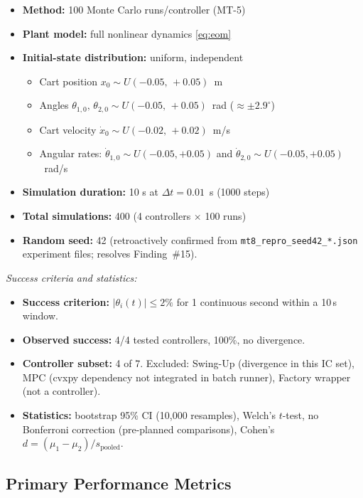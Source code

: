\documentclass[10pt, a4paper]{article}
\begin{document}
\begin{itemize}[noitemsep]
  \item \textbf{Method:} 100 Monte Carlo runs/controller (MT-5)
  \item \textbf{Plant model:} full nonlinear dynamics \eqref{eq:eom}
  \item \textbf{Initial-state distribution:} uniform, independent
    \begin{itemize}[noitemsep]
      \item Cart position $x_0 \sim U(-0.05,\, +0.05)$~m
      \item Angles $\theta_{1,0},\, \theta_{2,0} \sim U(-0.05,\, +0.05)$~rad ($\approx\pm2.9^\circ$)
      \item Cart velocity $\dot{x}_0 \sim U(-0.02,\, +0.02)$~m/s
      \item Angular rates: $\dot{\theta}_{1,0} \sim U(-0.05,+0.05)$ and
            $\dot{\theta}_{2,0} \sim U(-0.05,+0.05)$~rad/s
    \end{itemize}
  \item \textbf{Simulation duration:} 10 s at $\Delta t = 0.01$~s (1000 steps)
  \item \textbf{Total simulations:} 400 (4 controllers $\times$ 100 runs)
  \item \textbf{Random seed:} 42 (retroactively confirmed from
  \texttt{mt8\_repro\_seed42\_*.json} experiment files; resolves Finding~\#15).
\end{itemize}

\noindent\textit{Success criteria and statistics:}

\begin{itemize}[noitemsep]
  \item \textbf{Success criterion:} $|\theta_i(t)| \leq 2\%$ for 1 continuous second
        within a 10\,s window.
  \item \textbf{Observed success:} 4/4 tested controllers, 100\%, no divergence.
  \item \textbf{Controller subset:} 4 of 7.
        Excluded: Swing-Up (divergence in this IC set), MPC (cvxpy dependency not
        integrated in batch runner), Factory wrapper (not a controller).
  \item \textbf{Statistics:} bootstrap 95\% CI (10,000 resamples), Welch's $t$-test,
        no Bonferroni correction (pre-planned comparisons), Cohen's
        $d = (\mu_1 - \mu_2)/s_\text{pooled}$.
\end{itemize}

\subsection{Primary Performance Metrics}
\end{document}
